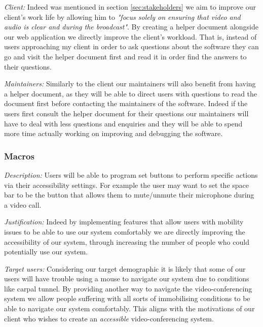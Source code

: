 \textit{Client:}
Indeed was mentioned in section \ref{sec:stakeholders}
we aim to improve our client's work life by allowing
him to \textit{"focus solely on ensuring that video
and audio is clear and during the broadcast"}. By creating
a helper document alongside our web application we directly
improve the client's workload. That is, instead of users
approaching my client in order to ask questions about the
software they can go and visit the helper document first
and read it in order find the answers to their questions.
\\ \vspace{0.2cm}

\textit{Maintainers:}
Similarly to the client our maintainers will also benefit
from having a helper document, as they will be able to
direct users with questions to read the document first
before contacting the maintainers of the software. Indeed
if the users first consult the helper document for their
questions our maintainers will have to deal with less
questions and enquiries and they will be able to spend more
time actually working on improving and debugging the software.
\\ \vspace{0.2cm}

\subsubsection{Macros}

\textit{Description:}
Users will be able to program set buttons to perform
specific actions via their accessibility settings. For
example the user may want to set the space bar to be the
button that allows them to mute/unmute their microphone
during a video call. \\ \vspace{0.2cm}

\textit{Justification:}
Indeed by implementing features that allow users with
mobility issues to be able to use our system comfortably we
are directly improving the accessibility of our system,
through increasing the number of people who could potentially
use our system. \\ \vspace{0.2cm}

\textit{Target users:}
Considering our target demographic it is likely that
some of our users will have trouble using a mouse
to navigate our system due to conditions like carpal tunnel.
By providing another way to navigate the video-conferencing
system we allow people suffering with all sorts of
immobilising conditions to be able to navigate our system
comfortably. This aligns with the motivations of our client
who wishes to create an \textit{accessible} video-conferencing
system.
\\ \vspace{0.2cm}

